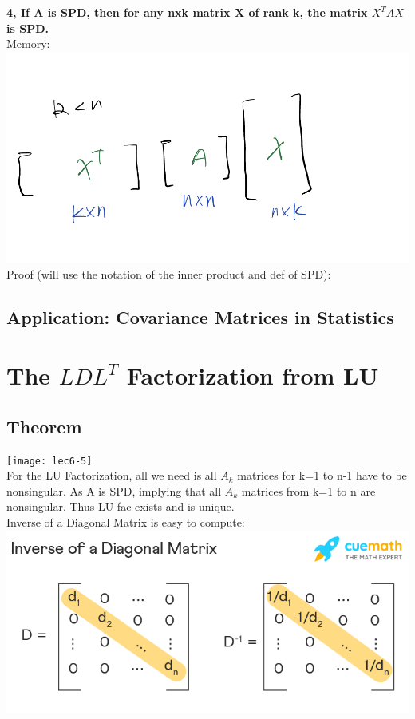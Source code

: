 \documentclass{article}
\begin{document}
\noindent
\textbf{4, If A is SPD, then for any nxk matrix X of rank k, the matrix $X^TAX$ is SPD.}\\
Memory:\\
\includegraphics[width=1\linewidth]{lec6-1.jpg}
Proof (will use the notation of the inner product and def of SPD):\\




\subsection*{Application: Covariance Matrices in Statistics}


\pagebreak
\section{The $LDL^T$ Factorization from LU}
\subsection*{Theorem}
\texttt{[image: lec6-5]}\\

\noindent
For the LU Factorization, all we need is all $A_k$ matrices for k=1 to n-1 have to
be nonsingular. As A is SPD, implying that all $A_k$ matrices from k=1 to n are nonsingular.
Thus LU fac exists and is unique.\\

\noindent
Inverse of a Diagonal Matrix is easy to compute:\\
\includegraphics[width=1\linewidth]{lec6-2.png}
\end{document}
